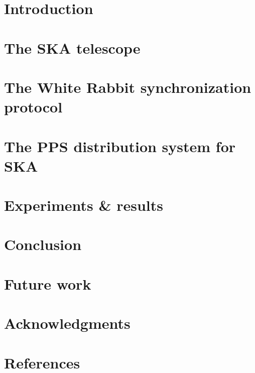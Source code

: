 \documentclass[review]{elsarticle}
\begin{document}
\linenumbers

\section{Introduction} \label{sec:intro}



%

\section{The SKA telescope} \label{sec:ska}



\section{The White Rabbit synchronization protocol} \label{sec:wr}



\section{The PPS distribution system for SKA} \label{sec:ska-pps-system}



\section{Experiments \& results} \label{sec:experiments}



\section{Conclusion} \label{sec:conclusion}



\section{Future work} \label{sec:future-work}



\section{Acknowledgments} \label{sec:acknowledgments}



\section*{References}\label{sec:references}


\end{document}
